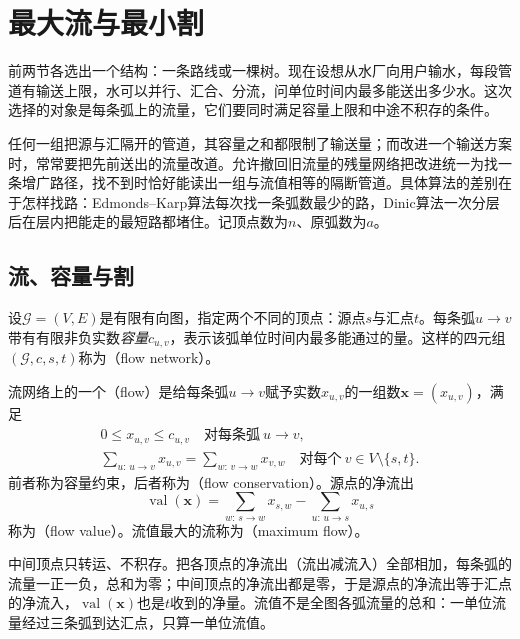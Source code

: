 
\section{最大流与最小割}
\label{sec:graph-max-flow}

前两节各选出一个结构：一条路线或一棵树。现在设想从水厂向用户输水，每段管道有输送上限，水可以并行、汇合、分流，问单位时间内最多能送出多少水。这次选择的对象是每条弧上的流量，它们要同时满足容量上限和中途不积存的条件。

任何一组把源与汇隔开的管道，其容量之和都限制了输送量；而改进一个输送方案时，常常要把先前送出的流量改道。允许撤回旧流量的残量网络把改进统一为找一条增广路径，找不到时恰好能读出一组与流值相等的隔断管道。具体算法的差别在于怎样找路：Edmonds--Karp算法每次找一条弧数最少的路，Dinic算法一次分层后在层内把能走的最短路都堵住。记顶点数为$n$、原弧数为$a$。

\subsection{流、容量与割}
\label{sec:graph-opt-flow-cut}

设$\mathcal G=(V,E)$是有限有向图，指定两个不同的顶点：源点$s$与汇点$t$。每条弧$u\to v$带有有限非负实数\emph{容量}$c_{u,v}$，表示该弧单位时间内最多能通过的量。这样的四元组$(\mathcal G,c,s,t)$称为（flow network）。

\begin{definition}[流与流值]
\label{def:graph-opt-flow}
流网络上的一个（flow）是给每条弧$u\to v$赋予实数$x_{u,v}$的一组数$\bm x=(x_{u,v})$，满足
\begin{gather}
  0\leq x_{u,v}\leq c_{u,v}\quad\text{对每条弧}\ u\to v,\label{eq:graph-opt-capacity}\\
  \sum_{u:\,u\to v}x_{u,v}=\sum_{w:\,v\to w}x_{v,w}\quad\text{对每个}\ v\in V\setminus\{s,t\}.\label{eq:graph-opt-conservation}
\end{gather}
前者称为容量约束，后者称为（flow conservation）。源点的净流出
\[
  \operatorname{val}(\bm x)=\sum_{w:\,s\to w}x_{s,w}-\sum_{u:\,u\to s}x_{u,s}
\]
称为（flow value）。流值最大的流称为（maximum flow）。
\end{definition}

中间顶点只转运、不积存。把各顶点的净流出（流出减流入）全部相加，每条弧的流量一正一负，总和为零；中间顶点的净流出都是零，于是源点的净流出等于汇点的净流入，$\operatorname{val}(\bm x)$也是$t$收到的净量。流值不是全图各弧流量的总和：一单位流量经过三条弧到达汇点，只算一单位流值。

